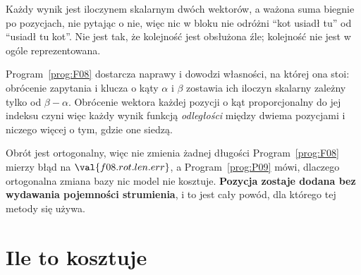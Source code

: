 \begin{fr}

Każdy wynik jest iloczynem skalarnym dwóch wektorów, a ważona suma biegnie po
pozycjach, nie pytając o nie, więc nic w bloku nie odróżni \enquote{kot
usiadł tu} od \enquote{usiadł tu kot}. Nie jest tak, że kolejność jest
obsłużona źle; kolejność nie jest w ogóle reprezentowana.

Program~\ref{prog:F08} dostarcza naprawy i dowodzi własności, na której ona
stoi: obrócenie zapytania i klucza o kąty $\alpha$ i $\beta$ zostawia ich
iloczyn skalarny zależny tylko od $\beta - \alpha$. Obrócenie wektora każdej
pozycji o kąt proporcjonalny do jej indeksu czyni więc każdy wynik funkcją
\emph{odległości} między dwiema pozycjami i niczego więcej o tym, gdzie one
siedzą.

Obrót jest ortogonalny, więc nie zmienia żadnej długości \dash{}
Program~\ref{prog:F08} mierzy błąd na $\val{f08.rot.len.err}$, a
Program~\ref{prog:P09} mówi, dlaczego ortogonalna zmiana bazy nic model nie
kosztuje. \textbf{Pozycja zostaje dodana bez wydawania pojemności
strumienia}, i to jest cały powód, dla którego tej metody się używa.
\end{fr}

\section{Ile to kosztuje}
\label{sec:P32-count}

